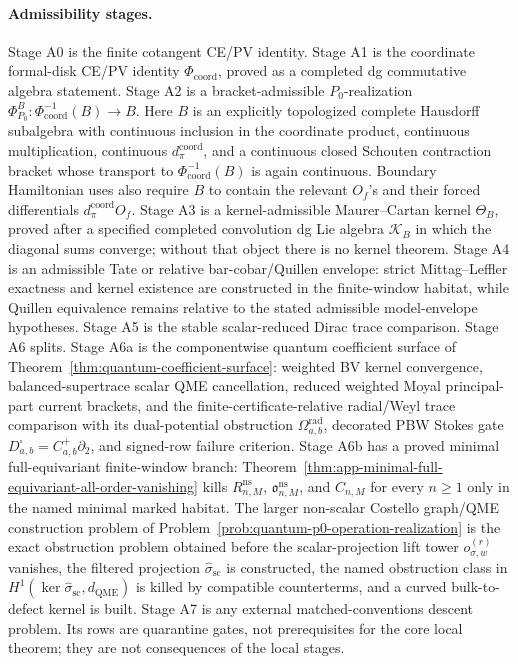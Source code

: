 \paragraph{Admissibility stages.}
Stage A0 is the finite cotangent CE/PV identity.  Stage A1 is the
coordinate formal-disk CE/PV identity \(\Phi_{\mathrm{coord}}\), proved
as a completed dg commutative algebra statement.  Stage A2 is a
bracket-admissible \(P_0\)-realization
\(\Phi^B_{P_0}\colon\Phi_{\mathrm{coord}}^{-1}(B)\to B\).  Here
\(B\) is an explicitly topologized complete Hausdorff subalgebra with
continuous inclusion in the coordinate product, continuous
multiplication, continuous \(d_\pi^{\mathrm{coord}}\), and a continuous
closed Schouten contraction bracket whose transport to
\(\Phi_{\mathrm{coord}}^{-1}(B)\) is again continuous.  Boundary
Hamiltonian uses also require \(B\) to contain the relevant \(O_f\)'s and
their forced differentials \(d_\pi^{\mathrm{coord}}O_f\).  Stage A3 is a
kernel-admissible Maurer--Cartan kernel \(\Theta_B\), proved after a
specified completed convolution dg Lie algebra \(\mathcal K_B\) in which
the diagonal sums converge; without that object there is no kernel
theorem.  Stage A4 is an admissible Tate or relative
bar-cobar/Quillen envelope: strict Mittag--Leffler exactness and kernel
existence are constructed in the finite-window habitat, while Quillen
equivalence remains relative to the stated admissible model-envelope
hypotheses.
Stage A5 is the stable scalar-reduced Dirac trace comparison.  Stage A6
splits.  Stage A6a is the componentwise quantum coefficient surface of
Theorem~\ref{thm:quantum-coefficient-surface}: weighted BV kernel
convergence, balanced-supertrace scalar QME cancellation, reduced
weighted Moyal principal-part current brackets, and the
finite-certificate-relative radial/Weyl trace comparison with its
dual-potential obstruction
\(\Omega^{\mathrm{rad}}_{a,b}\), decorated PBW Stokes gate
\(D^\square_{a,b}=C^+_{a,b}\partial_2\), and signed-row failure
criterion.  Stage A6b
has a proved minimal full-equivariant finite-window branch:
Theorem~\ref{thm:app-minimal-full-equivariant-all-order-vanishing}
kills \(R^{\mathrm{ns}}_{n,M}\),
\(\mathfrak o^{\mathrm{ns}}_{n,M}\), and \(C_{n,M}\) for every
\(n\geq1\) only in the named minimal marked habitat.  The larger
non-scalar Costello graph/QME construction problem of
Problem~\ref{prob:quantum-p0-operation-realization} is the exact
obstruction problem obtained before
the scalar-projection lift tower \(o_{\sigma,w}^{(r)}\) vanishes, the
filtered projection \(\widehat\sigma_{\mathrm{sc}}\) is constructed, the
named obstruction class in
\(H^1(\ker\widehat\sigma_{\mathrm{sc}},d_{\mathrm{QME}})\) is killed by
compatible counterterms, and a curved bulk-to-defect kernel is built.
Stage A7 is any external matched-conventions descent problem.  Its rows
are quarantine gates, not prerequisites for the core local theorem; they
are not consequences of the local stages.

